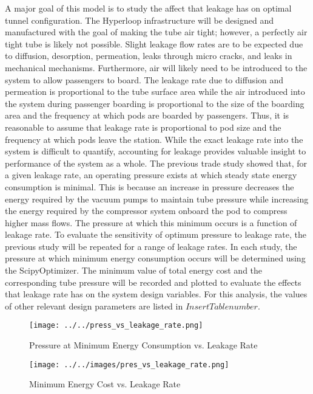A major goal of this model is to study the affect that leakage has on optimal tunnel configuration. The Hyperloop infrastructure will be designed and manufactured with the goal of making the tube air tight; however, a perfectly air tight tube is likely not possible. Slight leakage flow rates are to be expected due to diffusion, desorption, permeation, leaks through micro cracks, and leaks in mechanical mechanisms. Furthermore, air will likely need to be introduced to the system to allow passengers to board. The leakage rate due to diffusion and permeation is proportional to the tube surface area while the air introduced into the system during passenger boarding is proportional to the size of the boarding area and the frequency at which pods are boarded by passengers. Thus, it is reasonable to assume that leakage rate is proportional to pod size and the frequency at which pods leave the station. While the exact leakage rate into the system is difficult to quantify, accounting for leakage provides valuable insight to performance of the system as a whole.
The previous trade study showed that, for a given leakage rate, an operating pressure exists at which steady state energy consumption is minimal. This is because an increase in pressure decreases the energy required by the vacuum pumps to maintain tube pressure while increasing the energy required by the compressor system onboard the pod to compress higher mass flows. The pressure at which this minimum occurs is a function of leakage rate. To evaluate the sensitivity of optimum pressure to leakage rate, the previous study will be repeated for a range of leakage rates. In each study, the pressure at which minimum energy consumption occurs will be determined using the ScipyOptimizer. The minimum value of total energy cost and the corresponding tube pressure will be recorded and plotted to evaluate the effects that leakage rate has on the system design variables. For this analysis, the values of other relevant design parameters are listed in $Insert Table number$.
\begin{figure}
	\centering
	\texttt{[image: ../../press\_vs\_leakage\_rate.png]}
	\caption{Pressure at Minimum Energy Consumption vs. Leakage Rate}
	\label{fig:pres_vs_leakage_rate}
\end{figure}
\begin{figure}
	\centering
	\texttt{[image: ../../images/pres\_vs\_leakage\_rate.png]}
	\caption{Minimum Energy Cost vs. Leakage Rate}
	\label{fig:pres_vs_leakage_rate}
\end{figure}
